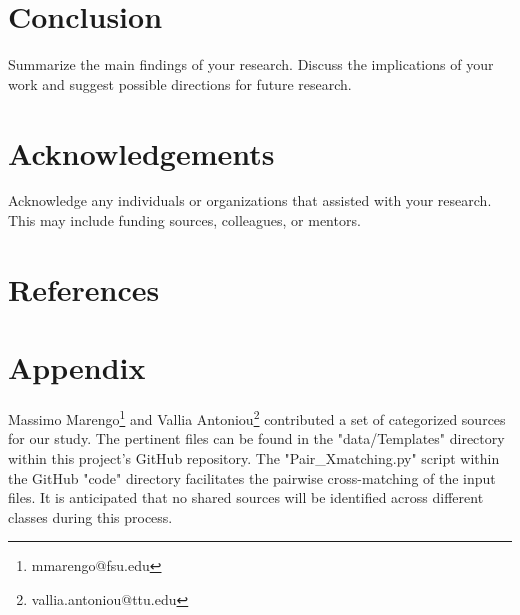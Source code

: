 \documentclass[a4paper, 15pt,usenatbib]{article}
\begin{document}
\section{Conclusion}
Summarize the main findings of your research. Discuss the implications of your work and suggest possible directions for future research.

\section{Acknowledgements}
Acknowledge any individuals or organizations that assisted with your research. This may include funding sources, colleagues, or mentors.

\section{References}
%
%






\clearpage
\appendix
\section*{Appendix}

Massimo Marengo\footnote{mmarengo@fsu.edu} and Vallia Antoniou\footnote{vallia.antoniou@ttu.edu} contributed a set of categorized sources for our study. The pertinent files can be found in the "data/Templates" directory within this project's GitHub repository. The "Pair\_Xmatching.py" script within the GitHub "code" directory facilitates the pairwise cross-matching of the input files. It is anticipated that no shared sources will be identified across different classes during this process.
\end{document}
